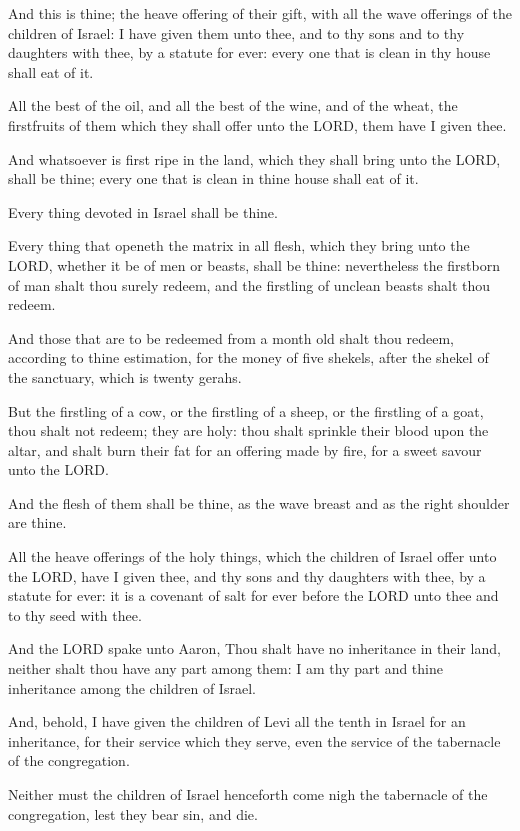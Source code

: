 \Verse And this is thine; the heave offering of their gift, with all
the wave offerings of the children of Israel: I have given them unto
thee, and to thy sons and to thy daughters with thee, by a statute for
ever: every one that is clean in thy house shall eat of it.

\Verse All the best of the oil, and all the best of the wine, and of
the wheat, the firstfruits of them which they shall offer unto the
LORD, them have I given thee.

\Verse And whatsoever is first ripe in the land, which they shall bring
unto the LORD, shall be thine; every one that is clean in thine house
shall eat of it.

\Verse Every thing devoted in Israel shall be thine.

\Verse Every thing that openeth the matrix in all flesh, which they
bring unto the LORD, whether it be of men or beasts, shall be thine:
nevertheless the firstborn of man shalt thou surely redeem, and the
firstling of unclean beasts shalt thou redeem.

\Verse And those that are to be redeemed from a month old shalt thou
redeem, according to thine estimation, for the money of five shekels,
after the shekel of the sanctuary, which is twenty gerahs.

\Verse But the firstling of a cow, or the firstling of a sheep, or the
firstling of a goat, thou shalt not redeem; they are holy: thou shalt
sprinkle their blood upon the altar, and shalt burn their fat for an
offering made by fire, for a sweet savour unto the LORD.

\Verse And the flesh of them shall be thine, as the wave breast and as
the right shoulder are thine.

\Verse All the heave offerings of the holy things, which the children
of Israel offer unto the LORD, have I given thee, and thy sons and thy
daughters with thee, by a statute for ever: it is a covenant of salt
for ever before the LORD unto thee and to thy seed with thee.

\Verse And the LORD spake unto Aaron, Thou shalt have no inheritance in
their land, neither shalt thou have any part among them: I am thy part
and thine inheritance among the children of Israel.

\Verse And, behold, I have given the children of Levi all the tenth in
Israel for an inheritance, for their service which they serve, even
the service of the tabernacle of the congregation.

\Verse Neither must the children of Israel henceforth come nigh the
tabernacle of the congregation, lest they bear sin, and die.

